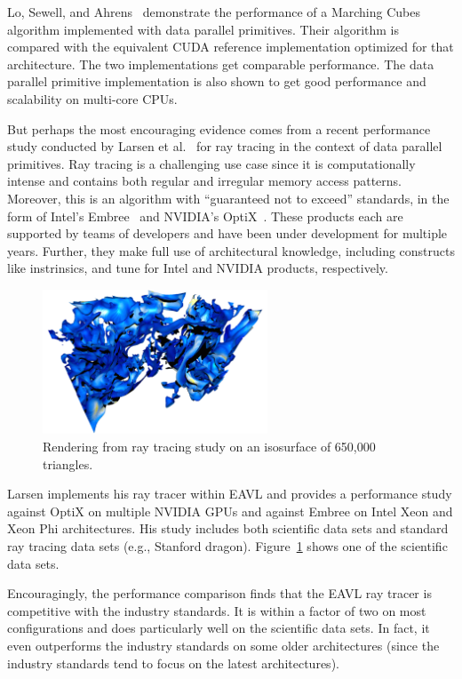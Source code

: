 \documentclass{superfri}
\newcommand*{\scite}[1]{~\cite{#1}}
\newcommand{\etal}{et al.\xspace}
\begin{document}
Lo, Sewell, and Ahrens\scite{PISTON} demonstrate the performance of a
Marching Cubes algorithm implemented with data parallel primitives. Their
algorithm is compared with the equivalent CUDA reference implementation
optimized for that architecture. The two implementations get comparable
performance. The data parallel primitive implementation is also shown to
get good performance and scalability on multi-core CPUs.

But perhaps the most encouraging evidence comes from a recent performance
study conducted by Larsen \etal\scite{Larsen:PacVis2015} for ray tracing in
the context of data parallel primitives.
%
Ray tracing is a challenging use case since it is computationally
intense and contains both regular and irregular memory access patterns.
%
Moreover, this is an algorithm with ``guaranteed not to exceed''
standards, in the form of Intel's Embree\scite{wald2014embree} and
NVIDIA's OptiX\scite{parker2010optix}.
%
These products each are supported by teams of developers and have been under
development for multiple years. 
%
Further, they make full use of architectural knowledge, including
constructs like instrinsics, and tune for 
Intel and NVIDIA products, respectively.

\begin{figure}
  \includegraphics[width=2.64in]{images/rm650_teaser}
  \caption{Rendering from ray tracing study on an isosurface of 650,000 triangles.\\}
  \label{fig:raytracing}
  \vspace{-\baselineskip}
\end{figure}
Larsen implements his ray tracer within EAVL and provides a performance
study against OptiX on multiple NVIDIA GPUs and against Embree on Intel Xeon
and Xeon Phi architectures.  
%
His study includes both scientific data sets and standard
ray tracing data sets (e.g., Stanford dragon).
%
Figure~\ref{fig:raytracing} shows one of the scientific data sets.

Encouragingly, the performance comparison finds that the EAVL
ray tracer is competitive with the industry standards.
%
It is within a factor of two on most configurations and does particularly
well on the scientific data sets.
%
In fact, it even outperforms the industry standards on some older
architectures (since the industry standards tend to focus on 
the latest architectures).
%
\end{document}
